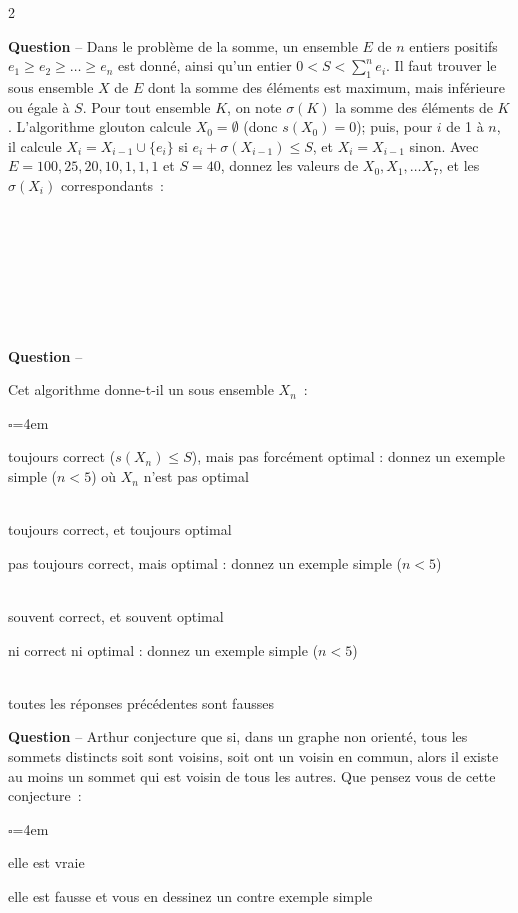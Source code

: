 \documentclass[11pt]{article}
\newcounter{QNumber}
\newcommand{\Question}[2][:]{
 \stepcounter{QNumber}
  \noindent\textbf{Question \theQNumber} --
  #2~#1}
\newenvironment{Reponse}{
 \begin{list}{$\square$}{\leftmargin=4em}}{
 \end{list}\vspace{1em}}
\newcommand{\Vrai}{
 \item[\ifthenelse{\boolean{correction}}{$\blacksquare$}{$\square$}]}
\newcommand{\Faux}{\item[$\square$]}
\begin{document}
\begin{multicols}{2}
\Question{Dans le probl\`eme de la somme, un ensemble $E$ de $n$ entiers positifs $e_1 \ge e_2 \ge \ldots \ge e_n$ est donn\'e, ainsi
qu'un entier $0<S < \sum_1^n e_i$. Il faut trouver le sous ensemble $X$ de $E$ dont la somme des \'el\'ements
est maximum, mais inf\'erieure ou \'egale \`a $S$.  Pour tout ensemble $K$, on note $\sigma(K)$ la somme des \'el\'ements de $K$.
L'algorithme glouton calcule $X_0=\emptyset$ (donc $s(X_0)=0$);  puis, 
pour $i$ de 1 \`a $n$, il calcule $X_i= X_{i-1} \cup \{e_i\}$ si $e_i + \sigma(X_{i-1}) \le S$, et
$X_i= X_{i-1}$ sinon. Avec $E=100,25,20,10,1,1,1$ et $S=40$, donnez les valeurs de $X_0, X_1, \ldots X_7$, et les $\sigma(X_i)$ correspondants}

~\\
~\\
~\\
~\\
~\\
~\\
~\\

\Question{
Cet algorithme donne-t-il un sous ensemble $X_n$}
\begin{Reponse} 
\Vrai toujours correct ($s(X_n)\le S$), mais pas forc\'ement optimal : donnez un exemple simple ($n<5$) o\`u $X_n$ n'est pas optimal\\
~
\Faux toujours correct, et toujours optimal
\Faux pas toujours correct, mais optimal :  donnez un exemple simple ($n<5$) \\
~ 
\Faux souvent correct, et souvent optimal
\Faux ni correct ni optimal : donnez un exemple simple ($n<5$) \\
~
\Faux toutes les r\'eponses pr\'ec\'edentes sont fausses 
\end{Reponse}


\Question{Arthur conjecture que si, dans un graphe non orient\'e, tous les sommets distincts soit sont voisins, 
soit ont un voisin en commun, alors il existe au moins un sommet qui est voisin de tous les autres.  Que pensez vous de cette conjecture}
\begin{Reponse}
\Faux elle est vraie
\Vrai elle est fausse et vous en dessinez un contre exemple simple \\
~\\
\end{Reponse}


\end{multicols}
\end{document}
